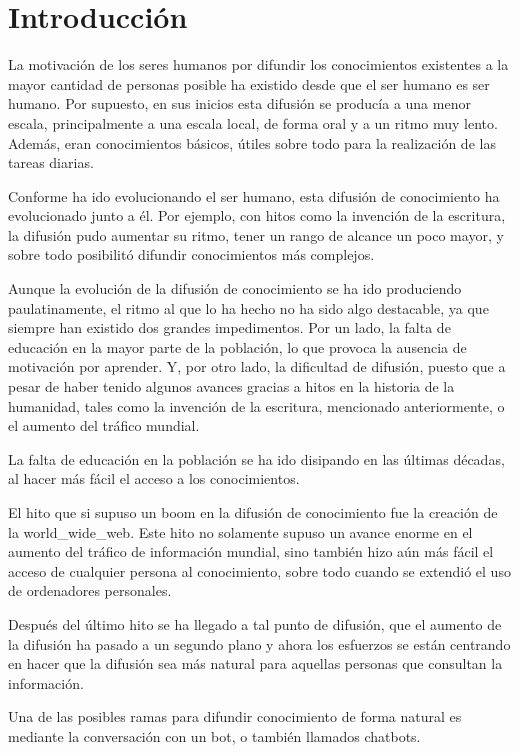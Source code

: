 \chapter{Introducción}

La motivación de los seres humanos por difundir los conocimientos existentes a la mayor cantidad de personas posible ha existido desde que el ser humano es ser humano. Por supuesto, en sus inicios esta difusión se producía a una menor escala, principalmente a una escala local, de forma oral y a un ritmo muy lento. Además, eran conocimientos básicos, útiles sobre todo para la realización de las tareas diarias.

Conforme ha ido evolucionando el ser humano, esta difusión de conocimiento ha evolucionado junto a él. Por ejemplo, con hitos como la invención de la escritura, la difusión pudo aumentar su ritmo, tener un rango de alcance un poco mayor, y sobre todo posibilitó difundir conocimientos más complejos.

Aunque la evolución de la difusión de conocimiento se ha ido produciendo paulatinamente, el ritmo al que lo ha hecho no ha sido algo destacable, ya que siempre han existido dos grandes impedimentos. Por un lado, la falta de educación en la mayor parte de la población, lo que provoca la ausencia de motivación por aprender. Y, por otro lado, la dificultad de difusión, puesto que a pesar de haber tenido algunos avances gracias a hitos en la historia de la humanidad, tales como la invención de la escritura, mencionado anteriormente, o el aumento del tráfico mundial.

La falta de educación en la población se ha ido disipando en las últimas décadas, al hacer más fácil el acceso a los conocimientos.

El hito que si supuso un boom en la difusión de conocimiento fue la creación de la \gls{world_wide_web}. Este hito no solamente supuso un avance enorme en el aumento del tráfico de información mundial, sino también hizo aún más fácil el acceso de cualquier persona al conocimiento, sobre todo cuando se extendió el uso de ordenadores personales.

Después del último hito se ha llegado a tal punto de difusión, que el aumento de la difusión ha pasado a un segundo plano y ahora los esfuerzos se están centrando en hacer que la difusión sea más natural para aquellas personas que consultan la información.

Una de las posibles ramas para difundir conocimiento de forma natural es mediante la conversación con un \gls{bot}, o también llamados chatbots.

